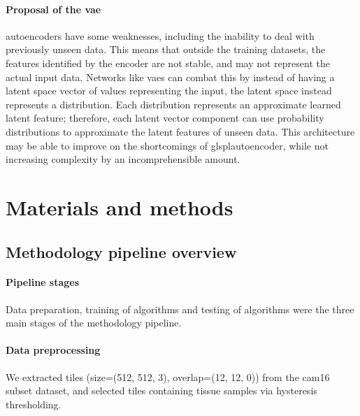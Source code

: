 \documentclass[review]{elsarticle}
\begin{document}
\paragraph{Proposal of the \gls{vae}} \glspl{autoencoder} have some weaknesses, including the inability to deal with previously unseen data. This means that outside the training datasets, the features identified by the encoder are not stable, and may not represent the actual input data. Networks like \glspl{vae} can combat this by instead of having a latent space vector of values representing the input, the latent space instead represents a distribution. Each distribution represents an approximate learned latent feature; therefore, each latent vector component can use probability distributions to approximate the latent features of unseen data.
This architecture may be able to improve on the shortcomings of glspl{autoencoder}, while not increasing complexity by an incomprehensible amount.

\section{Materials and methods}
\subsection{Methodology pipeline overview}
\paragraph{Pipeline stages} Data preparation, training of algorithms and testing of algorithms were the three main stages of the methodology pipeline.



\paragraph{Data preprocessing}
We extracted tiles (size=(512, 512, 3), overlap=(12, 12, 0)) from the \gls{cam16} subset dataset, and selected tiles containing tissue samples via hysteresis thresholding.
\end{document}
